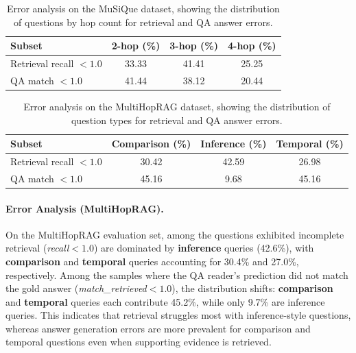 \documentclass{article} %
\begin{document}
\begin{table}[ht]
\centering
\small
\caption{Error analysis on the MuSiQue dataset, showing the distribution of questions by hop count for retrieval and QA answer errors.}
\begin{tabular}{l|c|c|c}
\toprule
\textbf{Subset} & \textbf{2-hop (\%)} & \textbf{3-hop (\%)} & \textbf{4-hop (\%)} \\
\midrule
Retrieval recall $<1.0$ & 33.33 & 41.41 & 25.25 \\
\midrule
QA match $<1.0$         & 41.44 & 38.12 & 20.44 \\
\bottomrule
\end{tabular}
\label{tab:musique-error-hops}
\end{table}



\begin{table}[ht]
\centering
\small
\caption{Error analysis on the MultiHopRAG dataset, showing the distribution of question types for retrieval and QA answer errors.}
\begin{tabular}{l|c|c|c}
\toprule
\textbf{Subset} & \textbf{Comparison (\%)} & \textbf{Inference (\%)} & \textbf{Temporal (\%)} \\
\midrule
Retrieval recall $<1.0$ & 30.42 & 42.59 & 26.98 \\
\midrule
QA match $<1.0$         & 45.16 & 9.68  & 45.16 \\
\bottomrule
\end{tabular}
\label{tab:multihoprag-error-types}
\end{table}

\paragraph{Error Analysis (MultiHopRAG).}
On the MultiHopRAG evaluation set, among the questions exhibited incomplete retrieval (\textit{recall}$<1.0$) are dominated by
\textbf{inference} queries (42.6\%), with \textbf{comparison} and
\textbf{temporal} queries accounting for 30.4\% and 27.0\%, respectively.
Among the samples where the QA reader’s prediction did not match the gold answer (\textit{match\_retrieved}$<1.0$), the distribution shifts:
\textbf{comparison} and \textbf{temporal} queries each contribute 45.2\%, while only 9.7\% are inference queries.
This indicates that retrieval struggles most with inference-style questions, whereas answer generation errors are more prevalent for comparison and temporal questions even when supporting evidence is retrieved.
\end{document}
